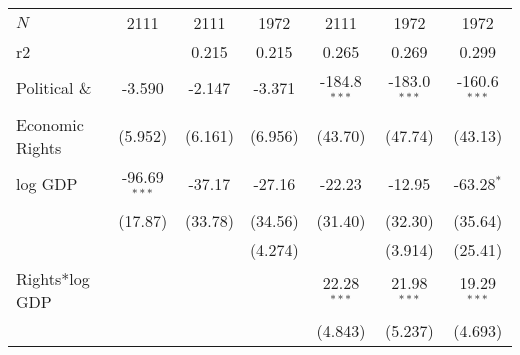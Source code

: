 \documentclass[9pt,letterpaper,subeqn]{beamer}
\begin{document}
\begin{frame}[label=RightsComp]
\begin{table}[htbp]
{\begin{tabular}{l*{6}{c}}
\hline
\(N\)       &        2111         &        2111         &        1972         &        2111         &        1972         &        1972         \\
r2          &                     &       0.215         &       0.215         &       0.265         &       0.269         &       0.299         \\
\hline\hline

\multicolumn{1}{p{2cm}}{Political \& }       &      -3.590         &      -2.147         &      -3.371         &      -184.8$^{***}$&      -183.0$^{***}$&      -160.6$^{***}$\\
 Economic Rights          &     (5.952)         &     (6.161)         &     (6.956)         &     (43.70)         &     (47.74)         &     (43.13)         \\

log GDP        &      -96.69$^{***}$&      -37.17         &      -27.16         &      -22.23         &      -12.95         &      -63.28$^{*}$  \\
            &     (17.87)         &     (33.78)         &     (34.56)         &     (31.40)         &     (32.30)         &     (35.64)         \\

            &                     &                     &     (4.274)         &                     &     (3.914)         &     (25.41)         \\

Rights*log GDP    &                     &                     &                     &       22.28$^{***}$&       21.98$^{***}$&       19.29$^{***}$\\
            &                     &                     &                     &     (4.843)         &     (5.237)         &     (4.693)         \\



\end{tabular}}
\end{table}
\end{frame}
\end{document}
